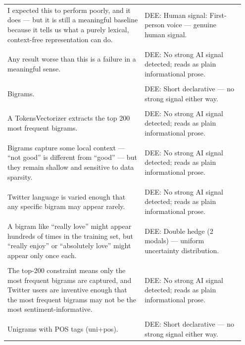 \documentclass[11pt]{article}
\begin{document}
\begin{longtable}{|p{0.55\linewidth}|p{0.40\linewidth}|}
\hline
\rule{0pt}{3.5cm} & \\
\hline
I expected this to perform poorly, and it does --- but it is still a meaningful baseline because it tells us what a purely lexical, context-free representation can do. & DEE: Human signal: First-person voice --- genuine human signal. \\[2pt]
\hline
\rule{0pt}{3.5cm} & \\
\hline
Any result worse than this is a failure in a meaningful sense. & DEE: No strong AI signal detected; reads as plain informational prose. \\[2pt]
\hline
\rule{0pt}{3.5cm} & \\
\hline
Bigrams. & DEE: Short declarative --- no strong signal either way. \\[2pt]
\hline
\rule{0pt}{3.5cm} & \\
\hline
A TokensVectorizer extracts the top 200 most frequent bigrams. & DEE: No strong AI signal detected; reads as plain informational prose. \\[2pt]
\hline
\rule{0pt}{3.5cm} & \\
\hline
Bigrams capture some local context --- ``not good'' is different from ``good'' --- but they remain shallow and sensitive to data sparsity. & DEE: No strong AI signal detected; reads as plain informational prose. \\[2pt]
\hline
\rule{0pt}{3.5cm} & \\
\hline
Twitter language is varied enough that any specific bigram may appear rarely. & DEE: No strong AI signal detected; reads as plain informational prose. \\[2pt]
\hline
\rule{0pt}{3.5cm} & \\
\hline
A bigram like ``really love'' might appear hundreds of times in the training set, but ``really enjoy'' or ``absolutely love'' might appear only once each. & DEE: Double hedge (2 modals) --- uniform uncertainty distribution. \\[2pt]
\hline
\rule{0pt}{3.5cm} & \\
\hline
The top-200 constraint means only the most frequent bigrams are captured, and Twitter users are inventive enough that the most frequent bigrams may not be the most sentiment-informative. & DEE: No strong AI signal detected; reads as plain informational prose. \\[2pt]
\hline
\rule{0pt}{3.5cm} & \\
\hline
Unigrams with POS tags (uni+pos). & DEE: Short declarative --- no strong signal either way. \\[2pt]

\end{longtable}
\end{document}
